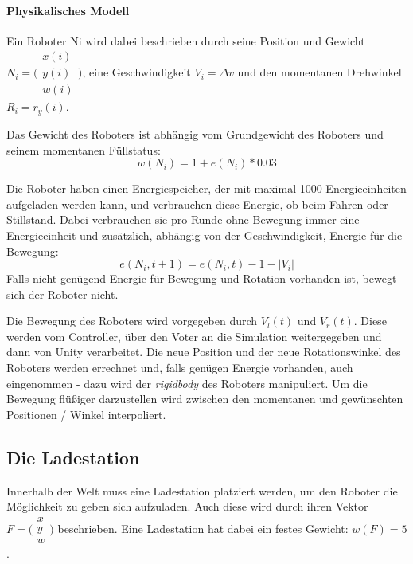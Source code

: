 \paragraph{Physikalisches Modell}
Ein Roboter \gls{Ni} wird dabei beschrieben durch seine Position und Gewicht
$ N_i = \bigl(\begin{smallmatrix} x(i) \\ y(i) \\ w(i) \end{smallmatrix}\bigr)$, eine
Geschwindigkeit $ V_i = \Delta v $ und den momentanen Drehwinkel
$ R_i = r_y(i)$. 

Das Gewicht des Roboters ist abh{\"{a}}ngig vom Grundgewicht des Roboters und seinem momentanen F{\"{u}}llstatus: 
\begin{equation}
    \label{eq:w}
 w(N_i) = 1 + e(N_i) * 0.03
\end{equation}

Die Roboter haben einen Energiespeicher, der mit maximal 1000 Energieeinheiten
aufgeladen werden kann, und verbrauchen diese Energie, ob beim Fahren oder
Stillstand. Dabei verbrauchen sie pro Runde ohne Bewegung immer eine Energieeinheit und zus{\"{a}}tzlich, abh{\"{a}}ngig von der Geschwindigkeit, Energie f{\"{u}}r die Bewegung:
\begin{equation}
    \label{eq:entladen}
	e(N_i, t + 1) = e(N_i, t) - 1 - |V_i|
\end{equation}
Falls nicht gen{\"{u}}gend Energie f{\"{u}}r Bewegung und Rotation vorhanden ist, bewegt sich der Roboter nicht.

Die Bewegung des Roboters wird vorgegeben durch $V_l(t)$ und $ V_r(t)$. Diese werden vom Controller, {\"{u}}ber den Voter an die Simulation weitergegeben und dann von Unity verarbeitet.
Die neue Position und der neue Rotationswinkel des Roboters werden errechnet und, falls gen{\"{u}}gen Energie
vorhanden, auch eingenommen - dazu wird der \textit{rigidbody} des Roboters manipuliert.
Um die Bewegung fl{\"{u}}{\ss}iger darzustellen wird zwischen den momentanen und gew{\"{u}}nschten Positionen / Winkel interpoliert.

\subsection{Die Ladestation}\label{fuelstation}
Innerhalb der Welt muss eine Ladestation platziert werden, um den Roboter die M{\"{o}}glichkeit zu geben sich aufzuladen. Auch diese wird durch ihren Vektor $ F = \bigl(\begin{smallmatrix} x \\ y \\ w \end{smallmatrix}\bigr)$ beschrieben. Eine Ladestation hat dabei ein festes Gewicht: $ w(F) = 5 $.

